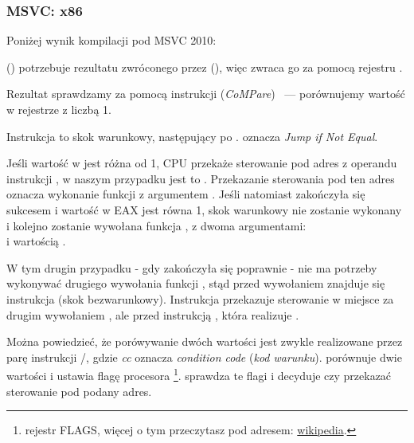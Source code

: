 \subsubsection{MSVC: x86}

Poniżej wynik kompilacji pod MSVC 2010:



 (\main) potrzebuje rezultatu zwróconego przez  (\scanf),
więc  zwraca go za pomocą rejestru \EAX.

Rezultat sprawdzamy za pomocą instrukcji  (\emph{CoMPare}) ~--- porównujemy wartość w rejestrze \EAX z liczbą 1.

Instrukcja \JNE to skok warunkowy, następujący po \CMP. \JNE oznacza \emph{Jump if Not Equal}.

Jeśli wartość w \EAX jest różna od 1, \ac{CPU} przekaże sterowanie pod adres z operandu instrukcji \JNE, w naszym przypadku jest to .
Przekazanie sterowania pod ten adres oznacza wykonanie funkcji \printf z argumentem .
Jeśli natomiast \scanf zakończyła się sukcesem i wartość w EAX jest równa 1, skok warunkowy nie zostanie wykonany i kolejno zostanie wywołana funkcja \printf, z dwoma argumentami:\\
 i wartością .

W tym drugin przypadku - gdy \scanf zakończyła się poprawnie - nie ma potrzeby wykonywać drugiego wywołania funkcji \printf, stąd przed wywołaniem znajduje się instrukcja \JMP (skok bezwarunkowy).
Instrukcja przekazuje sterowanie w miejsce za drugim wywołaniem \printf, ale przed instrukcją , która realizuje .

Można powiedzieć, że porówywanie dwóch wartości jest zwykle realizowane przez parę instrukcji \CMP/\Jcc, gdzie \emph{cc} oznacza \emph{condition code} (\emph{kod warunku}).
\CMP porównuje dwie wartości i ustawia flagę procesora \footnote{rejestr FLAGS, więcej o tym przeczytasz pod adresem: \href{http://en.wikipedia.org/wiki/FLAGS_register_(computing)}{wikipedia}.}.
\Jcc sprawdza te flagi i decyduje czy przekazać sterowanie pod podany adres.

